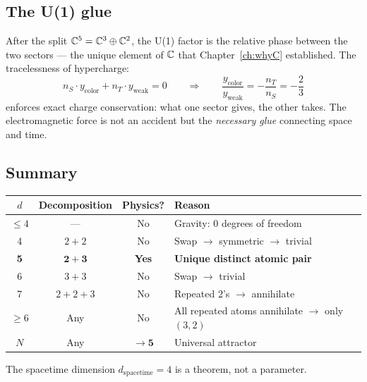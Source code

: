 \subsection{The U(1) glue}
\label{sec:glue}

After the split $\mathbb{C}^5 = \mathbb{C}^3 \oplus \mathbb{C}^2$, the U(1) factor is the relative phase between the two sectors --- the unique element of $\mathbb{C}$ that Chapter~\ref{ch:whyC} established. The tracelessness of hypercharge:
\begin{equation}
n_S \cdot y_\text{color} + n_T \cdot y_\text{weak} = 0 \qquad\Rightarrow\qquad \frac{y_\text{color}}{y_\text{weak}} = -\frac{n_T}{n_S} = -\frac{2}{3}
\end{equation}
enforces exact charge conservation: what one sector gives, the other takes. The electromagnetic force is not an accident but the \emph{necessary glue} connecting space and time.

\subsection{Summary}

\begin{center}
\begin{tabular}{cccl}
\hline
$d$ & Decomposition & Physics? & Reason \\
\hline
$\leq 4$ & --- & No & Gravity: 0 degrees of freedom \\
4 & $2+2$ & No & Swap $\to$ symmetric $\to$ trivial \\
\textbf{5} & $\mathbf{2+3}$ & \textbf{Yes} & \textbf{Unique distinct atomic pair} \\
6 & $3+3$ & No & Swap $\to$ trivial \\
7 & $2+2+3$ & No & Repeated 2's $\to$ annihilate \\
$\geq 6$ & Any & No & All repeated atoms annihilate $\to$ only $(3,2)$ \\
$N$ & Any & $\to \mathbf{5}$ & Universal attractor \\
\hline
\end{tabular}
\end{center}

\noindent The spacetime dimension $d_\text{spacetime} = 4$ is a theorem, not a parameter.
